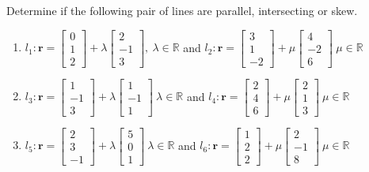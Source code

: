 \documentclass[11pt,a4paper]{book}
\newcommand{\R}{\mathbb{R}}
\begin{document}
\begin{example}

Determine if the following pair of lines are parallel, intersecting
or skew.

\begin{enumerate}[label=(\alph*)]

\item  $l_{1}:\textbf{r}=\begin{bmatrix}0\\
1\\
2
\end{bmatrix}+\lambda\begin{bmatrix}2\\
-1\\
3
\end{bmatrix},\:\lambda\in\R$ and $l_{2}:\textbf{r}=\begin{bmatrix}3\\
1\\
-2
\end{bmatrix}+\mu\begin{bmatrix}4\\
-2\\
6
\end{bmatrix}\:\mu\in\R$

\item $l_{3}:\textbf{r}=\begin{bmatrix}1\\
-1\\
3
\end{bmatrix}+\lambda\begin{bmatrix}1\\
-1\\
1
\end{bmatrix}\:\lambda\in\R$ and $l_{4}:\textbf{r}=\begin{bmatrix}2\\
4\\
6
\end{bmatrix}+\mu\begin{bmatrix}2\\
1\\
3
\end{bmatrix}\:\mu\in\R$

\item $l_{5}:\textbf{r}=\begin{bmatrix}2\\
3\\
-1
\end{bmatrix}+\lambda\begin{bmatrix}5\\
0\\
1
\end{bmatrix}\:\lambda\in\R$ and $l_{6}:\textbf{r}=\begin{bmatrix}1\\
2\\
2
\end{bmatrix}+\mu\begin{bmatrix}2\\
-1\\
8
\end{bmatrix}\:\mu\in\R$


\end{enumerate}
\end{example}
\end{document}
